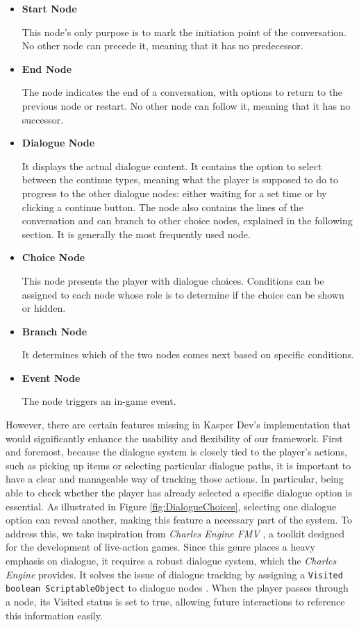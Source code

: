\begin{itemize}
    \item \textbf{Start Node}
    
This node's only purpose is to mark the initiation point of the conversation. No other node can precede it, meaning that it has no predecessor.

    \item \textbf{End Node}

The node indicates the end of a conversation, with options to return to the previous node or restart. No other node can follow it, meaning that it has no successor.

    \item \textbf{Dialogue Node}

It displays the actual dialogue content. It contains the option to select between the continue types, meaning what the player is supposed to do to progress to the other dialogue nodes: either waiting for a set time or by clicking a continue button. The node also contains the lines of the conversation and can branch to other choice nodes, explained in the following section. It is generally the most frequently used node.

    \item \textbf{Choice Node}

This node presents the player with dialogue choices. Conditions can be assigned to each node whose role is to determine if the choice can be shown or hidden.

    \item \textbf{Branch Node}

It determines which of the two nodes comes next based on specific conditions.

    \item \textbf{Event Node}

The node triggers an in-game event.
\end{itemize}

However, there are certain features missing in Kasper Dev's implementation that would significantly enhance the usability and flexibility of our framework. First and foremost, because the dialogue system is closely tied to the player’s actions, such as picking up items or selecting particular dialogue paths, it is important to have a clear and manageable way of tracking those actions. In particular, being able to check whether the player has already selected a specific dialogue option is essential. As illustrated in Figure \ref{fig:DialogueChoices}, selecting one dialogue option can reveal another, making this feature a necessary part of the system. To address this, we take inspiration from \textit{Charles Engine FMV} \cite{CharlesEngine}, a toolkit designed for the development of live-action games. Since this genre places a heavy emphasis on dialogue, it requires a robust dialogue system, which the \textit{Charles Engine} provides. It solves the issue of dialogue tracking by assigning a \verb|Visited boolean ScriptableObject| to dialogue nodes \cite{CharlesEngine-tut}. When the player passes through a node, its Visited status is set to true, allowing future interactions to reference this information easily.

